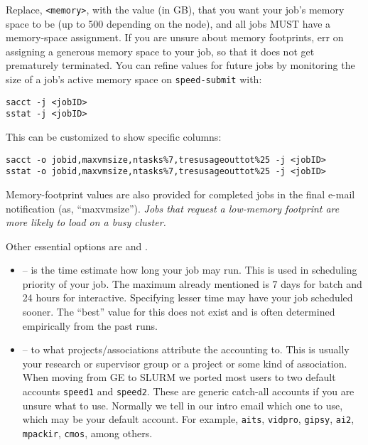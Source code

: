 Replace, \verb+<memory>+, with the value (in GB), that you want 
your job's memory space to be (up to 500 depending on the node), and all jobs MUST have a memory-space 
assignment.
%
If you are unsure about memory footprints, err on assigning a generous
memory space to your job, so that it does not get prematurely terminated.
You can refine
values for future jobs by monitoring the size of a job's active
memory space on \texttt{speed-submit} with:


\begin{verbatim}
sacct -j <jobID>
sstat -j <jobID>
\end{verbatim}

\noindent
This can be customized to show specific columns:

\begin{verbatim}
sacct -o jobid,maxvmsize,ntasks%7,tresusageouttot%25 -j <jobID>
sstat -o jobid,maxvmsize,ntasks%7,tresusageouttot%25 -j <jobID>
\end{verbatim}

Memory-footprint values are also provided for completed jobs in the final
e-mail notification (as, ``maxvmsize'').
%
\emph{Jobs that request a low-memory footprint are more likely to load on a busy
cluster.}

Other essential options are  and .
%
\begin{itemize}
\item
{} -- is the time estimate how long your job may run. This is
used in scheduling priority of your job. The maximum already mentioned
is 7 days for batch and 24 hours for interactive. Specifying lesser
time may have your job scheduled sooner. The ``best'' value for this
does not exist and is often determined empirically from the past runs.

\item
{} -- to what projects/associations attribute the accounting to. This is usually
your research or supervisor group or a project or some kind of
association. When moving from GE to SLURM we ported most users to
two default accounts \texttt{speed1} and \texttt{speed2}. These
are generic catch-all accounts if you are unsure what to use.
Normally we tell in our intro email which one to use, which may
be your default account. For example,
\texttt{aits},
\texttt{vidpro},
\texttt{gipsy},
\texttt{ai2},
\texttt{mpackir},
\texttt{cmos}, among others.

\end{itemize}
